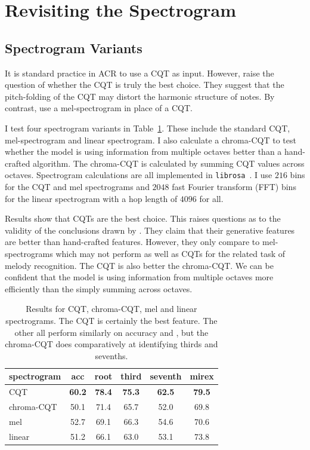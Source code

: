 \section{Revisiting the Spectrogram}\label{sec:spectrogram-results}

\subsection{Spectrogram Variants}\label{sec:spectrogram-variants}

It is standard practice in ACR to use a CQT as input. However, \citet{20YearsofACR} raise the question of whether the CQT is truly the best choice. They suggest that the pitch-folding of the CQT may distort the harmonic structure of notes. By contrast, \citet{MelodyTranscriptionViaGenerativePreTraining} use a mel-spectrogram in place of a CQT. 

I test four spectrogram variants in Table~\ref{tab:spectrograms}. These include the standard CQT, mel-spectrogram and linear spectrogram. I also calculate a chroma-CQT to test whether the model is using information from multiple octaves better than a hand-crafted algorithm. The chroma-CQT is calculated by summing CQT values across octaves. Spectrogram calculations are all implemented in \texttt{librosa}~\citep{librosa}. I use $216$ bins for the CQT and mel spectrograms and $2048$ fast Fourier transform (FFT) bins for the linear spectrogram with a hop length of $4096$ for all. 

Results show that CQTs are the best choice. This raises questions as to the validity of the conclusions drawn by \citet{MelodyTranscriptionViaGenerativePreTraining}. They claim that their generative features are better than hand-crafted features. However, they only compare to mel-spectrograms which may not perform as well as CQTs for the related task of melody recognition. The CQT is also better the chroma-CQT. We can be confident that the model is using information from multiple octaves more efficiently than the simply summing across octaves.

\begin{table}[h]
    \centering
    \begin{tabular}{lccccc}
        \toprule
        spectrogram & acc & root & third & seventh & mirex \\  
        \midrule
        CQT & \textbf{60.2} & \textbf{78.4} & \textbf{75.3} & \textbf{62.5} & \textbf{79.5} \\
        chroma-CQT & 50.1 & 71.4 & 65.7 & 52.0 & 69.8 \\
        mel & 52.7 & 69.1 & 66.3 & 54.6 & 70.6 \\
        linear & 51.2 & 66.1 & 63.0 & 53.1 & 73.8 \\
        \bottomrule
    \end{tabular}
    \caption{Results for CQT, chroma-CQT, mel and linear spectrograms. The CQT is certainly the best feature. The other all perform similarly on accuracy and , but the chroma-CQT does comparatively at identifying thirds and sevenths. }\label{tab:spectrograms}
\end{table}

